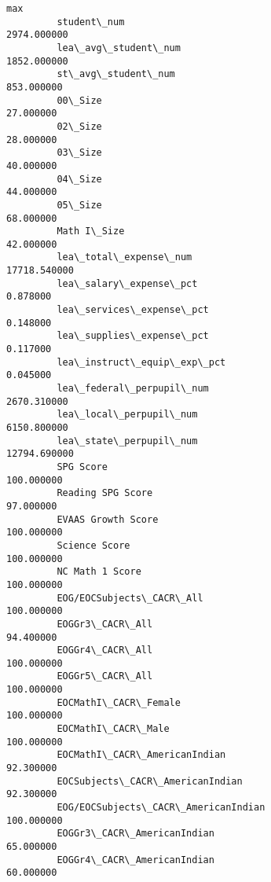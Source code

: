 \documentclass[11pt]{article}
\begin{document}
\begin{Verbatim}[commandchars=\\\{\}]
                                                                       max  
         student\_num                                           2974.000000  
         lea\_avg\_student\_num                                   1852.000000  
         st\_avg\_student\_num                                     853.000000  
         00\_Size                                                 27.000000  
         02\_Size                                                 28.000000  
         03\_Size                                                 40.000000  
         04\_Size                                                 44.000000  
         05\_Size                                                 68.000000  
         Math I\_Size                                             42.000000  
         lea\_total\_expense\_num                                17718.540000  
         lea\_salary\_expense\_pct                                   0.878000  
         lea\_services\_expense\_pct                                 0.148000  
         lea\_supplies\_expense\_pct                                 0.117000  
         lea\_instruct\_equip\_exp\_pct                               0.045000  
         lea\_federal\_perpupil\_num                              2670.310000  
         lea\_local\_perpupil\_num                                6150.800000  
         lea\_state\_perpupil\_num                               12794.690000  
         SPG Score                                              100.000000  
         Reading SPG Score                                       97.000000  
         EVAAS Growth Score                                     100.000000  
         Science Score                                          100.000000  
         NC Math 1 Score                                        100.000000  
         EOG/EOCSubjects\_CACR\_All                               100.000000  
         EOGGr3\_CACR\_All                                         94.400000  
         EOGGr4\_CACR\_All                                        100.000000  
         EOGGr5\_CACR\_All                                        100.000000  
         EOCMathI\_CACR\_Female                                   100.000000  
         EOCMathI\_CACR\_Male                                     100.000000  
         EOCMathI\_CACR\_AmericanIndian                            92.300000  
         EOCSubjects\_CACR\_AmericanIndian                         92.300000  
         EOG/EOCSubjects\_CACR\_AmericanIndian                    100.000000  
         EOGGr3\_CACR\_AmericanIndian                              65.000000  
         EOGGr4\_CACR\_AmericanIndian                              60.000000  

\end{Verbatim}
\end{document}
